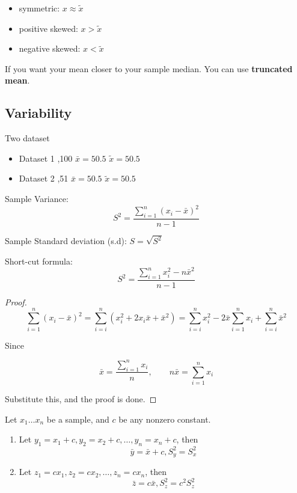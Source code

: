 \begin{itemize}
  \item symmetric: $x\approx \tilde{x}$
  \item positive skewed: $x>\tilde{x}$
  \item negative skewed: $x<\tilde{x}$
\end{itemize}

If you want your mean closer to your sample median. You can use \textbf{truncated mean}.

\subsection{Variability}
\begin{exmp}
Two dataset
  \begin{itemize}
    \item Dataset 1 ,100 \qquad  $\bar{x}=50.5$ \qquad $\tilde{x}=50.5$
    \item Dataset 2 ,51 \qquad  $\bar{x}=50.5$ \qquad $\tilde{x}=50.5$
  \end{itemize}
\end{exmp}

Sample Variance: \[S^2=\frac{\sum_{i=1}^{n} (x_i-\bar{x})^2}{n-1}\]

Sample Standard deviation (s.d): $S=\sqrt{S^2}$

Short-cut formula:
\[S^2=\frac{{\sum_{i=1}^{n} x_i^2} - n{\bar{x}}^2}{n-1}
\]
\begin{proof}
\[\sum_{i=1}^{n}(x_i-\bar{x})^2=
\sum_{i=i}^{n}(x_i^2+2x_i\bar{x}+{\bar{x}}^2)=
\sum_{i=i}^{n}x_i^2-2\bar{x}\sum_{i=1}^{n}x_i+
\sum_{i=i}^{n}\bar{x}^2 \]

Since 

\[\bar{x}=\frac{\sum_{i=1}^{n} x_i}{n}, \qquad n\bar{x}=\sum_{i=1}^{n} x_i \]

Substitute this, and the proof is done. 
\end{proof}

\begin{prop}
Let $x_1 \dots x_n$ be a sample, and $c$ be any nonzero constant.

\begin{enumerate}
\item Let $y_1=x_1+c,y_2=x_2+c,\dots,y_n=x_n+c$, then
\[\bar{y}=\bar{x}+c, S_y^2=S_x^2\]
\item Let $z_1=cx_1,z_2=cx_2,\dots,z_n=cx_n$, then
\[\bar{z}=c \bar{x}, S_z^2=c^2S_z^2\]
\end{enumerate}
\end{prop}


